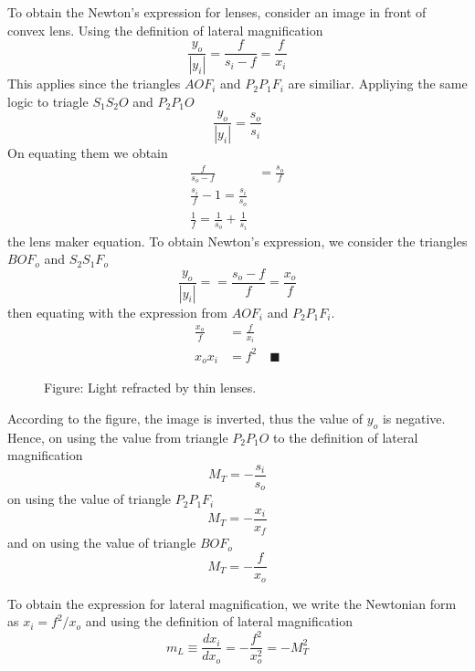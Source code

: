 \documentclass[../../../main.tex]{subfiles}
\begin{document}
To obtain the Newton's expression for lenses, consider an image in front of convex lens. Using the definition of lateral magnification 
\begin{equation*}
    \frac{y_o}{|y_i|}=\frac{f}{s_i-f}=\frac{f}{x_i}
\end{equation*}
This applies since the triangles $AOF_i$ and $P_2P_1F_i$ are similiar. Appliying the same logic to triagle $S_1S_2O$ and $P_2P_1O$
\begin{equation*}
    \frac{y_o}{|y_i|}=\frac{s_o}{s_i}
\end{equation*}
On equating them we obtain
\begin{align*}
    \frac{f}{s_o-f}&=\frac{s_o}{f}\\
    \frac{s_i}{f}-1=\frac{s_i}{s_o}\\
    \frac{1}{f}=\frac{1}{s_o}+\frac{1}{s_i}
\end{align*}
the lens maker equation. To obtain Newton's expression, we consider the triangles $BOF_o$ and $S_2S_1F_o$
\begin{equation*}
    \frac{y_o}{|y_i|}==\frac{s_o-f}{f}=\frac{x_o}{f}
\end{equation*}
then equating with the expression from $AOF_i$ and $P_2P_1F_i$.
\begin{align*}
    \frac{x_o}{f}&=\frac{f}{x_i}\\
    x_ox_i&=f^2\quad\blacksquare
\end{align*}

\begin{figure}
    \centering
    \caption*{Figure: Light refracted by thin lenses.}
\end{figure}

According to the figure, the image is inverted, thus the value of $y_o$ is negative. Hence, on using the value from triangle $P_2P_1O$ to the definition of lateral magnification
\begin{equation*}
    M_T=-\frac{s_i}{s_o}
\end{equation*}
on using the value of triangle $P_2P_1F_i$
\begin{equation*}
    M_T=-\frac{x_i}{x_f}
\end{equation*}
and on using the value of triangle $BOF_o$
\begin{equation*}
    M_T=-\frac{f}{x_o}
\end{equation*}

To obtain the expression for lateral magnification, we write the Newtonian form as $x_i=f^2/x_o$ and using the definition of lateral magnification
\begin{equation*}
    m_L\equiv\frac{dx_i}{dx_o}=-\frac{f^2}{x_o^2}=-M_T^2
\end{equation*}
\end{document}
